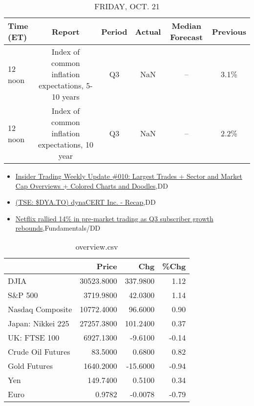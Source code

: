 \documentclass{article}%
\begin{document}
%


\begin{table}[htbp]%
\caption{FRIDAY, OCT. 21}%
\centering%
\begin{adjustbox}{width=1\textwidth}%
\begin{tabular}{lccccc}
\toprule
Time (ET) &                                             Report & Period & Actual & Median Forecast & Previous \\
\midrule
  12 noon & Index of common inflation expectations, 5-10 years &     Q3 &    NaN &              -- &     3.1\% \\
  12 noon &    Index of common inflation expectations, 10 year &     Q3 &    NaN &              -- &     2.2\% \\
\bottomrule
\end{tabular}
%
\end{adjustbox}%
\end{table}

%
\begin{itemize}%
\item%
\href{https://reddit.com/r/wallstreetbets/comments/y82fvh/insider\_trading\_weekly\_update\_010\_largest\_trades/}{Insider Trading Weekly Update \#010: Largest Trades + Sector and Market Cap Overviews + Colored Charts and Doodles},DD%
\item%
\href{https://reddit.com/r/Baystreetbets/comments/y77mjx/tse\_dyato\_dynacert\_inc\_recap/}{(TSE: \$DYA.TO) dynaCERT Inc. - Recap},DD%
\item%
\href{https://reddit.com/r/StockMarket/comments/y80sxq/netflix\_rallied\_14\_in\_premarket\_trading\_as\_q3/}{Netflix rallied 14\% in pre-market trading as Q3 subscriber growth rebounds},Fundamentals/DD%
\end{itemize}%


\begin{table}[htbp]%
\caption{overview.csv}%
\centering%
\begin{adjustbox}{width=1\textwidth}%
\begin{tabular}{lrrr}
\toprule
                  &      Price &      Chg &  \%Chg \\
\midrule
             DJIA & 30523.8000 & 337.9800 &  1.12 \\
          S\&P 500 &  3719.9800 &  42.0300 &  1.14 \\
 Nasdaq Composite & 10772.4000 &  96.6000 &  0.90 \\
Japan: Nikkei 225 & 27257.3800 & 101.2400 &  0.37 \\
     UK: FTSE 100 &  6927.1300 &  -9.6100 & -0.14 \\
Crude Oil Futures &    83.5000 &   0.6800 &  0.82 \\
     Gold Futures &  1640.2000 & -15.6000 & -0.94 \\
              Yen &   149.7400 &   0.5100 &  0.34 \\
             Euro &     0.9782 &  -0.0078 & -0.79 \\
\bottomrule
\end{tabular}
%
\end{adjustbox}%
\end{table}
\end{document}

